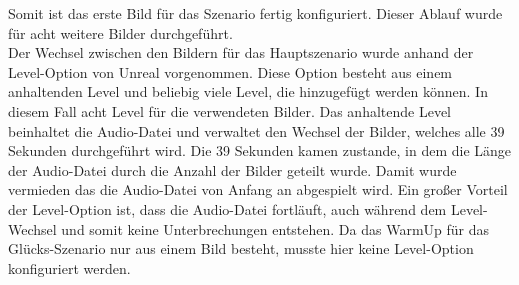 Somit ist das erste Bild für das Szenario fertig konfiguriert. 
Dieser Ablauf wurde für acht weitere Bilder durchgeführt. \\

Der Wechsel zwischen den Bildern für das Hauptszenario wurde anhand der Level-Option von Unreal vorgenommen. 
Diese Option besteht aus einem anhaltenden Level und beliebig viele Level, die hinzugefügt werden können. 
In diesem Fall acht Level für die verwendeten Bilder. 
Das anhaltende Level beinhaltet die Audio-Datei und verwaltet den Wechsel der Bilder, welches alle 39 Sekunden durchgeführt wird. Die 39 Sekunden kamen zustande, in dem die Länge der Audio-Datei durch die Anzahl der Bilder geteilt wurde. 
Damit wurde vermieden das die Audio-Datei von Anfang an abgespielt wird. 
Ein großer Vorteil der Level-Option ist, dass die Audio-Datei fortläuft, auch während dem Level-Wechsel und somit keine Unterbrechungen entstehen. 
Da das WarmUp für das Glücks-Szenario nur aus einem Bild besteht, musste hier keine Level-Option konfiguriert werden. \\

